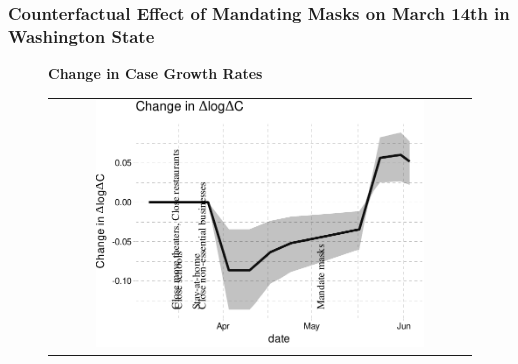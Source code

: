\documentclass{beamer}
\begin{document}
\begin{frame}
  \frametitle{Counterfactual Effect of Mandating Masks on March 14th in Washington State}


\begin{figure}[ht]
  \begin{minipage}{\linewidth}
    \centering
    \textbf{Change in Case Growth Rates}\\ \bigskip
    \begin{tabular}{c}
      \includegraphics[width=0.8\textwidth]{../tables_and_figures/Washington-mask-dgrowth_idx}
    \end{tabular}
  \end{minipage}
\end{figure}
 


\end{frame}

\end{document}
